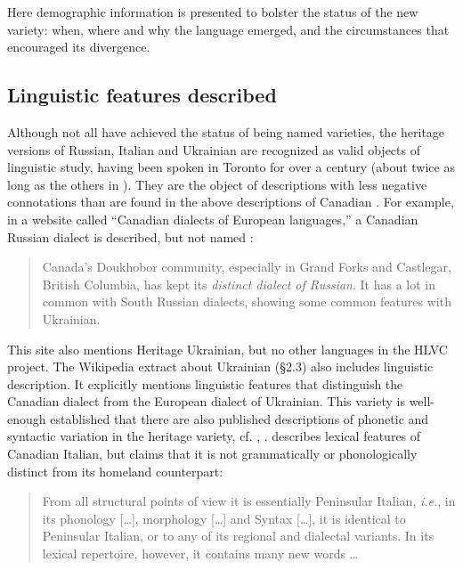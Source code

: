 \documentclass[output=paper]{LSP/langsci}
\begin{document}
Here demographic information is presented to bolster the status of the new variety: when, where and why the language emerged, and the circumstances that encouraged its divergence. 

\subsection{Linguistic features described}

Although not all have achieved the status of being named varieties, the heritage versions of Russian, Italian and Ukrainian are recognized as valid objects of linguistic study, having been spoken in Toronto for over a century (about twice as long as the others in ). They are the object of descriptions with less negative connotations than are found in the above descriptions of Canadian . For example, in a website called “Canadian dialects of European languages,” a Canadian Russian dialect is described, but not named \citep{language_factory_canadian_2013}:

\begin{quote}
Canada’s Doukhobor community, especially in Grand Forks and Castlegar, British Columbia, has kept its \textit{distinct dialect of Russian}. It has a lot in common with South Russian dialects, showing some common features with Ukrainian. 
\end{quote}

This site also mentions Heritage Ukrainian, but no other languages in the HLVC project. The Wikipedia extract about Ukrainian (§2.3) also includes linguistic description. It explicitly mentions linguistic features that distinguish the Canadian dialect from the European dialect of Ukrainian. This variety is well-enough established that there are also published descriptions of phonetic and syntactic variation in the heritage variety, cf. \citet{hudyma_ukrainian_2011}, \citet{struk_between_2000}. \citet{danesi_canadian_1983,danesi_canadian_1984} describes lexical features of Canadian Italian, but claims that it is not grammatically or phonologically distinct from its homeland counterpart: 

\begin{quote}
From all structural points of view it is essentially Peninsular Italian, \textit{i.e.}, in its phonology […], morphology […] and Syntax […], it is identical to Peninsular Italian, or to any of its regional and dialectal variants. In its lexical repertoire, however, it contains many new words … 
\end{quote}
\end{document}
